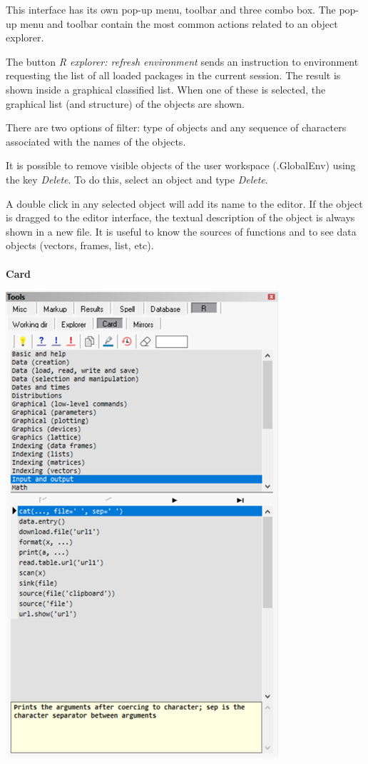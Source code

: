 This interface has its own pop-up menu, toolbar and three combo box.
The pop-up menu and toolbar contain the most common actions related to an object explorer.

The button \textit{R explorer: refresh environment} sends an instruction to
\RR{} environment requesting the list of all loaded packages in the current
session. The result is shown inside a graphical classified list. When one
of these is selected, the graphical list (and structure) of the objects
are shown.

There are two options of filter: type of objects and any sequence of
characters associated with the names of the objects.

It is possible to remove visible objects of the user workspace (.GlobalEnv)
using the key \textit{Delete}. To do this, select an object and type
\textit{Delete}.

A double click in any selected object will add its name to the editor.
If the object is dragged to the editor interface, the textual description
of the object is always shown in a new file. It is useful to know the
sources of functions and to see data objects (vectors, frames, list, etc).

\newpage
\paragraph{}\textbf{Card}\\

\includegraphics[scale=0.8]{./res/tools_r_card.png} \\

